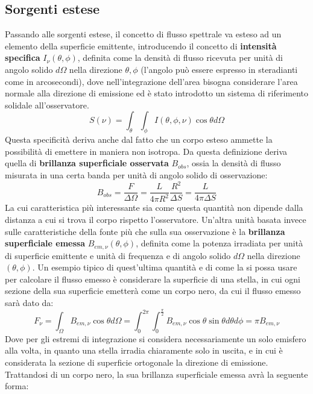 \documentclass[a4paper,twoside,openany,notitlepage]{book}
\theoremstyle{definition}
\theoremstyle{plain}
\begin{document}
\subsection*{Sorgenti estese}
Passando alle sorgenti estese, il concetto di flusso spettrale va esteso ad un elemento della superficie emittente, introducendo il concetto di \textbf{intensità specifica} $I_\nu (\theta,\phi)$, definita come la densità di flusso ricevuta per unità di angolo solido $d\Omega$ nella direzione $\theta,\phi$ (l'angolo può essere espresso in steradianti come in arcosecondi), dove nell'integrazione dell'area bisogna considerare l'area normale alla direzione di emissione ed è stato introdotto un sistema di riferimento solidale all'osservatore.
\begin{equation*}
	S(\nu)=\int_{\theta}^{}\int_{\phi}^{} I(\theta,\phi,\nu)\cos\theta d\Omega
\end{equation*}
Questa specificità deriva anche dal fatto che un corpo esteso ammette la possibilità di emettere in maniera non isotropa. Da questa definizione deriva quella di \textbf{brillanza superficiale osservata} $B_{obs}$, ossia la densità di flusso misurata in una certa banda per unità di angolo solido di osservazione:
\begin{equation*}
	B_{obs} = \frac{F}{\Delta\Omega} = \frac{L}{4\pi R^2}\frac{R^2}{\Delta S} =
	\frac{L}{4\pi\Delta S}
\end{equation*}
La cui caratteristica più interessante sia come questa quantità non dipende dalla distanza a cui si trova il corpo rispetto l'osservatore. Un'altra unità basata invece sulle caratteristiche della fonte più che sulla sua osservazione è la \textbf{brillanza superficiale emessa} $B_{em,\nu}(\theta,\phi)$, definita come la potenza irradiata per unità di superficie emittente e unità di frequenza e di angolo solido $d\Omega$ nella direzione $(\theta,\phi)$. Un esempio tipico di quest'ultima quantità e di come la si possa usare per calcolare il flusso emesso è considerare la superficie di una stella, in cui ogni sezione della sua superficie emetterà come un corpo nero, da cui il flusso emesso sarà dato da:
\begin{equation*}
	F_\nu = \int_{\Omega}^{} B_{em,\nu} \cos\theta d\Omega =
	\int_{0}^{2\pi} \int_{0}^{\frac{\pi}{2}} B_{em,\nu} \cos\theta\sin\theta d\theta d\phi =
	\pi B_{em,\nu}
\end{equation*}
Dove per gli estremi di integrazione si considera necessariamente un solo emisfero alla volta, in quanto una stella irradia chiaramente solo in uscita, e in cui è considerata la sezione di superficie ortogonale la direzione di emissione. Trattandosi di un corpo nero, la sua brillanza superficiale emessa avrà la seguente forma:
\end{document}
